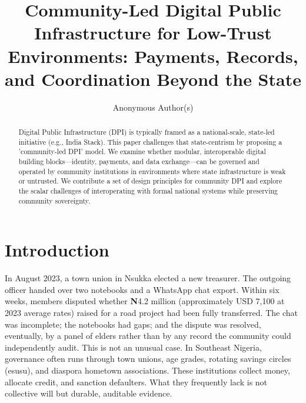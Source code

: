 \documentclass[sigconf,anonymous]{acmart}
\begin{document}
\title{Community-Led Digital Public Infrastructure for Low-Trust Environments: Payments, Records, and Coordination Beyond the State}

\author{Anonymous Author(s)}

\begin{abstract}
Digital Public Infrastructure (DPI) is typically framed as a national-scale, state-led initiative (e.g., India Stack). This paper challenges that state-centrism by proposing a 'community-led DPI' model. We examine whether modular, interoperable digital building blocks—identity, payments, and data exchange—can be governed and operated by community institutions in environments where state infrastructure is weak or untrusted. We contribute a set of design principles for community DPI and explore the scalar challenges of interoperating with formal national systems while preserving community sovereignty.
\end{abstract}



\maketitle

\section{Introduction}

In August 2023, a town union in Nsukka elected a new treasurer. The outgoing officer handed over two notebooks and a WhatsApp chat export. Within six weeks, members disputed whether \textbf{N}4.2 million (approximately USD 7,100 at 2023 average rates) raised for a road project had been fully transferred. The chat was incomplete; the notebooks had gaps; and the dispute was resolved, eventually, by a panel of elders rather than by any record the community could independently audit. This is not an unusual case. In Southeast Nigeria, governance often runs through town unions, age grades, rotating savings circles (esusu), and diaspora hometown associations. These institutions collect money, allocate credit, and sanction defaulters. What they frequently lack is not collective will but durable, auditable evidence.
\end{document}
